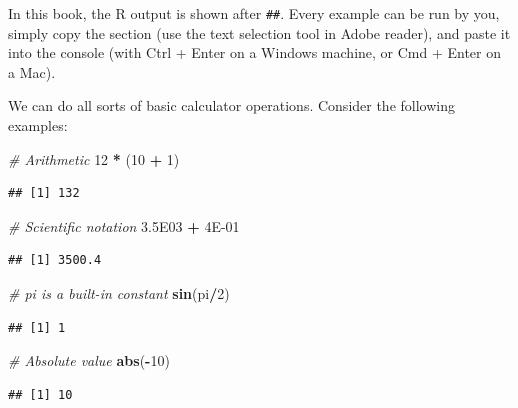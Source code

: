 \documentclass[]{book}
\newenvironment{Shaded}{\begin{snugshade}}{\end{snugshade}}
\newcommand{\CommentTok}[1]{\textcolor[rgb]{0.56,0.35,0.01}{\textit{#1}}}
\newcommand{\DecValTok}[1]{\textcolor[rgb]{0.00,0.00,0.81}{#1}}
\newcommand{\FloatTok}[1]{\textcolor[rgb]{0.00,0.00,0.81}{#1}}
\newcommand{\KeywordTok}[1]{\textcolor[rgb]{0.13,0.29,0.53}{\textbf{#1}}}
\newcommand{\NormalTok}[1]{#1}
\newcommand{\OperatorTok}[1]{\textcolor[rgb]{0.81,0.36,0.00}{\textbf{#1}}}
\newcommand{\StringTok}[1]{\textcolor[rgb]{0.31,0.60,0.02}{#1}}
\begin{document}
In this book, the R output is shown after \texttt{\#\#}. Every example can be run by you, simply copy the section (use the text selection tool in Adobe reader), and paste it into the console (with Ctrl + Enter on a Windows machine, or Cmd + Enter on a Mac).

We can do all sorts of basic calculator operations. Consider the following examples:

\begin{Shaded}
\begin{Highlighting}[]
\CommentTok{# Arithmetic}
\DecValTok{12} \OperatorTok{*}\StringTok{ }\NormalTok{(}\DecValTok{10} \OperatorTok{+}\StringTok{ }\DecValTok{1}\NormalTok{)}
\end{Highlighting}
\end{Shaded}

\begin{verbatim}
## [1] 132
\end{verbatim}

\begin{Shaded}
\begin{Highlighting}[]
\CommentTok{# Scientific notation}
\FloatTok{3.5E03} \OperatorTok{+}\StringTok{ }\FloatTok{4E-01}
\end{Highlighting}
\end{Shaded}

\begin{verbatim}
## [1] 3500.4
\end{verbatim}

\begin{Shaded}
\begin{Highlighting}[]
\CommentTok{# pi is a built-in constant}
\KeywordTok{sin}\NormalTok{(pi}\OperatorTok{/}\DecValTok{2}\NormalTok{)}
\end{Highlighting}
\end{Shaded}

\begin{verbatim}
## [1] 1
\end{verbatim}

\begin{Shaded}
\begin{Highlighting}[]
\CommentTok{# Absolute value}
\KeywordTok{abs}\NormalTok{(}\OperatorTok{-}\DecValTok{10}\NormalTok{)}
\end{Highlighting}
\end{Shaded}

\begin{verbatim}
## [1] 10
\end{verbatim}
\end{document}

